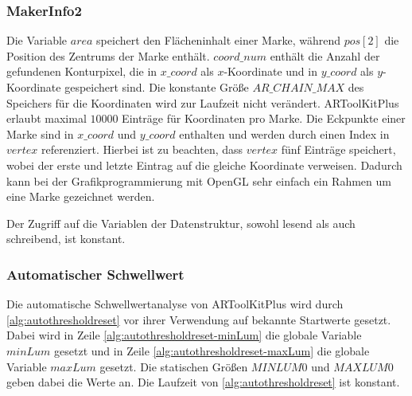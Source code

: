 

\subsubsection{MakerInfo2} %
\label{sec:makerinfo2}

Die Variable $\mathit{area}$ speichert den Flächeninhalt einer Marke, während $\mathit{pos}[2]$ die Position des
 Zentrums der Marke enthält. $\mathit{coord\_num}$ enthält die Anzahl der gefundenen Konturpixel, die in
 $\mathit{x\_coord}$ als $x$-Koordinate und in $\mathit{y\_coord}$ als $y$-Koordinate gespeichert sind. Die konstante
 Größe $\mathit{AR\_CHAIN\_MAX}$ des Speichers für die Koordinaten wird zur Laufzeit nicht verändert. ARToolKitPlus
 erlaubt maximal $10000$ Einträge für Koordinaten pro Marke. Die Eckpunkte einer Marke sind in $\mathit{x\_coord}$ und
 $\mathit{y\_coord}$ enthalten und werden durch einen Index in $\mathit{vertex}$ referenziert. Hierbei ist zu beachten,
 dass $\mathit{vertex}$ fünf Einträge speichert, wobei der erste und letzte Eintrag auf die gleiche Koordinate
 verweisen. Dadurch kann bei der Grafikprogrammierung mit OpenGL sehr einfach ein Rahmen um eine Marke gezeichnet
 werden.



Der Zugriff auf die Variablen der Datenstruktur, sowohl lesend als auch schreibend, ist konstant.


\subsubsection{Automatischer Schwellwert} %
\label{sec:automatischer_schwellwert}

Die automatische Schwellwertanalyse von ARToolKitPlus wird durch \autoref{alg:autothresholdreset} vor ihrer Verwendung
 auf bekannte Startwerte gesetzt. Dabei wird in Zeile \ref{alg:autothresholdreset-minLum} die globale Variable
 $\mathit{minLum}$ gesetzt und in Zeile \ref{alg:autothresholdreset-maxLum} die globale Variable $\mathit{maxLum}$
 gesetzt. Die statischen Größen $\mathit{MINLUM0}$ und $\mathit{MAXLUM0}$ geben dabei die Werte an. Die Laufzeit von
 \autoref{alg:autothresholdreset} ist konstant.




